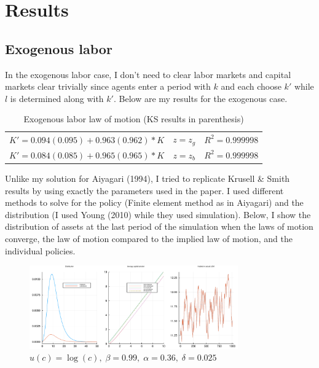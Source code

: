 \documentclass{article} %
\begin{document}
\section*{Results}
\subsection*{Exogenous labor}
In the exogenous labor case, I don't need to clear labor markets and capital markets clear trivially since agents enter a period with $k$ and each choose $k'$ while $l$ is determined along with $k'$. Below are my results for the exogenous case. 
\begin{table}[h!]
  \centering
\begin{tabular}{c c c}
  $K' = 0.094 (0.095) + 0.963 (0.962)*K$ & $z = z_g$ & $R^2 = 0.999998$ \\
  $K' = 0.084 (0.085) + 0.965 (0.965)*K$ & $z = z_b$ & $R^2 = 0.999998$
\end{tabular}
\caption{Exogenous labor law of motion (KS results in parenthesis)}
\end{table}
Unlike my solution for Aiyagari (1994), I tried to replicate Krusell \& Smith results by using exactly the parameters used in the paper. I used different methods to solve for the policy (Finite element method as in Aiyagari) and the distribution (I used Young (2010) while they used simulation). Below, I show the distribution of assets at the last period of the simulation when the laws of motion converge, the law of motion compared to the implied law of motion, and the individual policies.
\begin{figure}[h!]
  \centering
  \includegraphics[width = 0.8\textwidth]{../KS_Inelastic/exolaborks.pdf}
    \caption{$u(c)=\log(c),\; \beta = 0.99,\; \alpha=0.36,\; \delta =0.025$}
  \end{figure}
\end{document}
